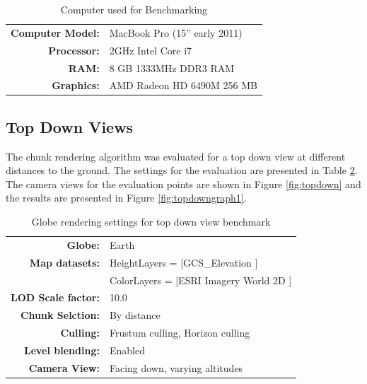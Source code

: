 \begin{table}[h]
  \centering
  \caption[]{Computer used for Benchmarking}
    \label{table:benchmark host}
  \begin{tabular}{| r l |}
    \hline
      \textbf{Computer Model:}  & MacBook Pro (15'' early 2011) \\
      \textbf{Processor:}       & 2GHz Intel Core i7 \\
      \textbf{RAM:}             & 8 GB 1333MHz DDR3 RAM \\
      \textbf{Graphics:}        & AMD Radeon HD 6490M 256 MB \\
    \hline
  \end{tabular}
\end{table}



\clearpage
\subsection{Top Down Views}
\FloatBarrier
The chunk rendering algorithm was evaluated for a top down view at different distances to the ground. The settings for the evaluation are presented in Table \ref{table:settingstopdown}. The camera views for the evaluation points are shown in Figure \ref{fig:topdown} and the results are presented in Figure \ref{fig:topdowngraph1}.
\begin{table}[h]
  \centering
  \caption[]{Globe rendering settings for top down view benchmark}
    \label{table:settingstopdown}
  \begin{tabular}{| r l |}
    \hline
      \textbf{Globe:}             & Earth \\
      \textbf{Map datasets:}      & HeightLayers = [GCS\_Elevation \cite{worldelevation3d}] \\
                                  & ColorLayers = [ESRI Imagery World 2D \cite{imageryworld2d}] \\
      \textbf{LOD Scale factor:}  & 10.0 \\
      \textbf{Chunk Selction:}    & By distance \\
      \textbf{Culling:}           & Frustum culling, Horizon culling \\
      \textbf{Level blending:}    & Enabled \\
      \textbf{Camera View:}       & Facing down, varying altitudes\\
    \hline
  \end{tabular}
\end{table}

